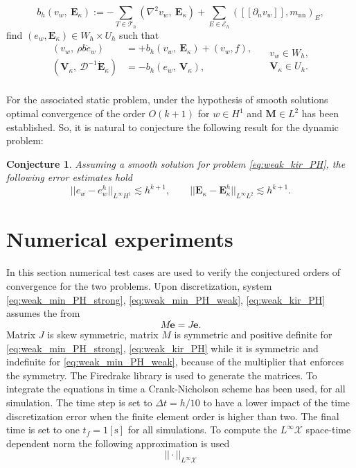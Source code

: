 \documentclass{ifacconf}
\newtheorem{conjecture}{Conjecture}
\begin{document}
\[
b_h(v_w, \ \bm{E}_{\kappa}) := - \sum_{T \in \mathcal{T}_h} ( \nabla^2 v_w, \ \bm{E}_\kappa) + \sum_{E \in \mathcal{E}_h} ([\![\partial_n v_w]\!], m_{\text{nn}})_{E}, 
\]
find $(e_w, \bm{E}_\kappa) \in W_h \times U_h$ such that
\begin{equation}
\label{eq:weak_kir_PH}
\begin{aligned}
(v_w, \ \rho b \dot{e}_w) &= +b_h(v_w, \ \bm{E}_{\kappa}) + (v_w, f), \\ 
(\bm{V}_\kappa, \ \mathcal{D}^{-1} \dot{\bm{E}}_\kappa) &= -b_h(e_w, \ \bm{V}_{\kappa}), \\ 
\end{aligned} \quad
\begin{aligned}
v_w \in W_h, \\
\bm{V}_\kappa \in U_h. \\
\end{aligned}
\end{equation}

For the associated static problem, under the hypothesis of smooth solutions optimal convergence of the order $O(k+1)$ for $w \in H^1$ and $\bm{M} \in L^2$ has been established. So, it is natural to conjecture the following result for the dynamic problem:
\begin{conjecture}
Assuming a smooth solution for problem \eqref{eq:weak_kir_PH}, the following error estimates hold
\begin{equation}
\label{eq:errHHJ}
||e_w - e_w^h||_{L^{\infty} H^1} \lesssim h^{k+1}, \qquad
||\bm{E}_\kappa - \bm{E}_\kappa^h||_{L^{\infty} L^2} \lesssim h^{k+1}.
\end{equation}
\end{conjecture}


\section{Numerical experiments}
In this section numerical test cases are used to verify the conjectured orders of convergence for the two problems. Upon discretization, system \eqref{eq:weak_min_PH_strong}, \eqref{eq:weak_min_PH_weak}, \eqref{eq:weak_kir_PH} assumes the from 
\[
M \dot{\bm{e}} = J \bm{e}.
\]
Matrix $J$ is skew symmetric, matrix $M$ is symmetric and positive definite for \eqref{eq:weak_min_PH_strong}, \eqref{eq:weak_kir_PH} while it is symmetric and indefinite for \eqref{eq:weak_min_PH_weak}, because of the multiplier that enforces the symmetry. The Firedrake library \cite{rathgeber2017firedrake} is used to generate the matrices. To integrate the equations in time a Crank-Nicholson scheme has been used, for all simulation. The time step is set to $\Delta t = h/10$ to have a lower impact of the time discretization error when the finite element order is higher than two. The final time is set to one $t_f = 1 [\textrm{s}]$ for all simulations. To compute the $L^\infty \mathcal{X}$ space-time dependent norm  the following approximation is used
\[
||\cdot ||_{L^\infty \mathcal{X}}
\]
\end{document}
